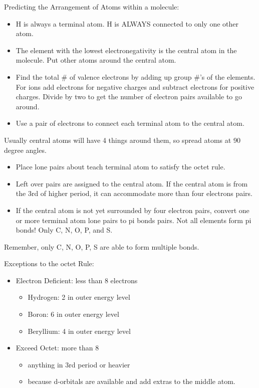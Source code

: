 \documentclass[../hchem.tex]{subfiles}
\begin{document}
Predicting the Arrangement of Atoms within a molecule:
\begin{itemize}
    \item H is always a terminal atom. H is ALWAYS connected to only one other atom.
    \item The element with the lowest electronegativity is the central atom in the molecule. Put other atoms around the central atom.
    \item Find the total \# of valence electrons by adding up group \#'s of the elements. For ions add electrons for negative charges and subtract electrons for positive charges. Divide by two to get the number of electron pairs available to go around.
    \item Use a pair of electrons to connect each terminal atom to the central atom.
\end{itemize}

Usually central atoms will have 4 things around them, so spread atoms at 90 degree angles.

\begin{itemize}
    \item Place lone pairs about teach terminal atom to satisfy the octet rule.
    \item Left over pairs are assigned to the central atom. If the central atom is from the 3rd of higher period, it can accommodate more than four electrons pairs.
    \item If the central atom is not yet surrounded by four electron pairs, convert one or more terminal atom lone pairs to 
    pi bonds pairs. Not all elements form pi bonds! Only C, N, O, P, and S.
\end{itemize}

Remember, only C, N, O, P, S are able to form multiple bonds.

Exceptions to the octet Rule:
\begin{itemize}
    \item Electron Deficient: less than 8 electrons 
    \begin{itemize}
        \item Hydrogen: 2 in outer energy level 
        \item Boron: 6 in outer energy level 
        \item Beryllium: 4 in outer energy level 
    \end{itemize}
    \item Exceed Octet: more than 8
    \begin{itemize}
        \item anything in 3rd period or heavier 
        \item because d-orbitals are available and add extras to the middle atom.
    \end{itemize}
\end{itemize}
\end{document}
